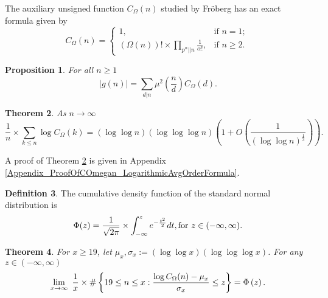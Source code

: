 \documentclass[11pt,reqno,a4letter]{article}
\newcommand{\hlocalref}[1]{\hyperref[#1]{\ref{#1}}}
\numberwithin{equation}{section}
\numberwithin{figure}{section}
\numberwithin{table}{section}
\theoremstyle{plain}
\newtheorem{theorem}{Theorem}
\newtheorem{prop}[theorem]{Proposition}
\numberwithin{theorem}{section}
\theoremstyle{definition}
\newtheorem{definition}[theorem]{Definition}
\theoremstyle{remark}
\newcommand{\mathtext}[1]{\text{\rm #1}}
\begin{document}
The auxiliary unsigned function $C_{\Omega}(n)$ studied by Fr\"oberg 
\cite{FROBERG-1968} has an exact formula given by 
\begin{equation}
\label{eqn_proof_tag_hInvn_ExactNestedSumFormula_CombInterpetIdent_v3}
C_{\Omega}(n) = \begin{cases}
     1, & \text{if $n = 1$; } \\ 
     (\Omega(n))! \times \prod\limits_{p^{\alpha}||n} \frac{1}{\alpha!}, & \text{if $n \geq 2$. }
     \end{cases}
\end{equation} 

\begin{prop} 
\label{lemma_AbsValueOf_gInvn_FornSquareFree_v1} 
For all $n \geq 1$ 
\begin{equation} 
\label{eqn_AbsValueOf_gInvn_FornSquareFree_v1} 
|g(n)| = \sum_{d|n} \mu^2\left(\frac{n}{d}\right) C_{\Omega}(d). 
\end{equation} 
\end{prop} 

\begin{theorem} 
\label{lemma_HatCAstxSum_ExactFormulaWithError_v1} 
As $n \rightarrow \infty$ 
\[
\frac{1}{n} \times \sum_{k \leq n} \log C_{\Omega}(k) = 
     (\log\log n)(\log\log\log n) \left(1 + 
     O\left(\frac{1}{(\log\log n)^{\frac{1}{3}}}\right)\right). 
\] 
\end{theorem} 

A proof of Theorem \hlocalref{lemma_HatCAstxSum_ExactFormulaWithError_v1} is 
given in Appendix \hlocalref{Appendix_ProofOfCOmegan_LogarithmicAvgOrderFormula}. 

\begin{definition}
The cumulative density function of the 
standard normal distribution is 
\[
\Phi(z) = \frac{1}{\sqrt{2\pi}} \times \int_{-\infty}^{z} e^{-\frac{t^2}{2}} dt, 
     \mathtext{ for } z \in (-\infty, \infty). 
\]
\end{definition}

\begin{theorem}
\label{conj_DetFormOfEKTypeThmForCOmegan_v1} 
For $x \geq 19$, let $\mu_x, \sigma_x := (\log\log x)(\log\log\log x)$.
For any $z \in (-\infty, \infty)$ 
\begin{equation} 
\notag
\lim_{x \rightarrow \infty} \ \frac{1}{x} \times 
	\#\left\{19 \leq n \leq x: \frac{\log C_{\Omega}(n) - \mu_x}{\sigma_x} \leq z\right\} = 
     \Phi\left(z\right). 
\end{equation}
\end{theorem} 
\end{document}
